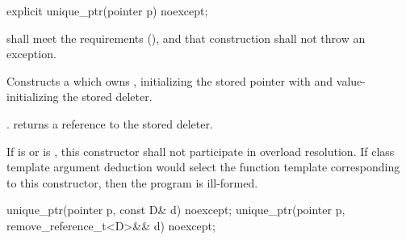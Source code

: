%
\begin{itemdecl}
explicit unique_ptr(pointer p) noexcept;
\end{itemdecl}

\begin{itemdescr}
\pnum
\requires {} shall
meet the  requirements (),
and that construction shall not throw an exception.

\pnum
\effects
Constructs a  which owns
, initializing the stored pointer with  and
value-initializing the stored deleter.

\pnum
\ensures
{}. 
returns a reference to the stored deleter.

\pnum
\remarks
If  is  or
 is ,
this constructor shall not participate in overload resolution.
If class template argument deduction
would select the function template corresponding to this constructor,
then the program is ill-formed.
\end{itemdescr}

%
\begin{itemdecl}
unique_ptr(pointer p, const D& d) noexcept;
unique_ptr(pointer p, remove_reference_t<D>&& d) noexcept;
\end{itemdecl}

